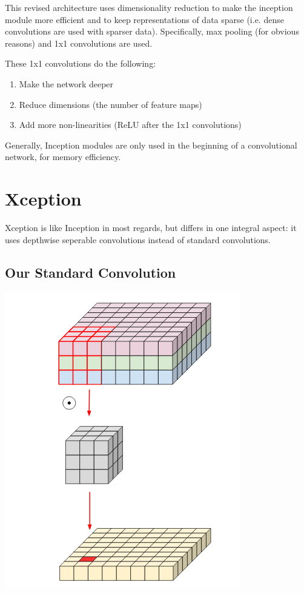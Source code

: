 \documentclass{article}
\begin{document}
    This revised architecture uses dimensionality reduction to make the inception module more efficient and to keep representations of data sparse (i.e. dense convolutions are used with sparser data). Specifically, max pooling (for obvious reasons) and 1x1 convolutions are used.
    
    These 1x1 convolutions do the following:
    \begin{enumerate}
        \item Make the network deeper
        \item Reduce dimensions (the number of feature maps)
        \item Add more non-linearities (ReLU after the 1x1 convolutions)
    \end{enumerate}
    
 Generally, Inception modules are only used in the beginning of a convolutional network, for memory efficiency. 

\section{Xception}
Xception is like Inception in most regards, but differs in one integral aspect: it uses depthwise seperable convolutions instead of standard convolutions. 
\subsection{Our Standard Convolution}
\begin{center}
\includegraphics[scale=0.5]{normal-conv.png}

\end{center}
\end{document}
